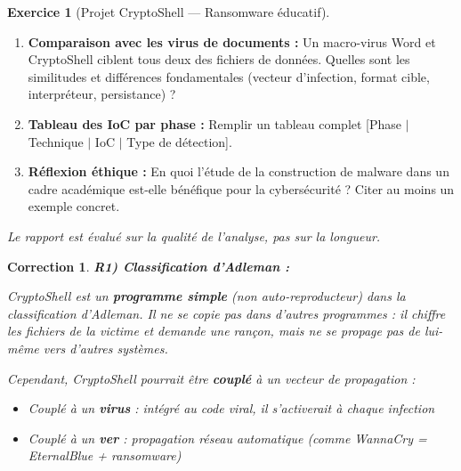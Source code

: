 \documentclass[a4paper,11pt]{article}
\theoremstyle{plain}
\newtheorem{correction}{Correction}
\theoremstyle{definition}
\newtheorem{exercice}{Exercice}
\begin{document}
\begin{exercice}[Projet CryptoShell --- Ransomware éducatif]
\begin{enumerate}
\item[\textbf{R4)}] \textbf{Comparaison avec les virus de documents :} Un macro-virus Word et CryptoShell ciblent tous deux des fichiers de données. Quelles sont les similitudes et différences fondamentales (vecteur d'infection, format cible, interpréteur, persistance) ?

\item[\textbf{R5)}] \textbf{Tableau des IoC par phase :} Remplir un tableau complet [Phase $|$ Technique $|$ IoC $|$ Type de détection].

\item[\textbf{R6)}] \textbf{Réflexion éthique :} En quoi l'étude de la construction de malware dans un cadre académique est-elle bénéfique pour la cybersécurité ? Citer au moins un exemple concret.
\end{enumerate}

\medskip
\noindent\textit{Le rapport est évalué sur la qualité de l'analyse, pas sur la longueur.}

\begin{correction}

\textbf{R1) Classification d'Adleman :}

CryptoShell est un \textbf{programme simple} (non auto-reproducteur) dans la classification d'Adleman. Il ne se copie pas dans d'autres programmes : il chiffre les fichiers de la victime et demande une rançon, mais ne se propage pas de lui-même vers d'autres systèmes.

Cependant, CryptoShell pourrait être \textbf{couplé} à un vecteur de propagation :
\begin{itemize}
    \item Couplé à un \textbf{virus} : intégré au code viral, il s'activerait à chaque infection
    \item Couplé à un \textbf{ver} : propagation réseau automatique (comme WannaCry = EternalBlue + ransomware)
\end{itemize}


\end{correction}
\end{exercice}
\end{document}
